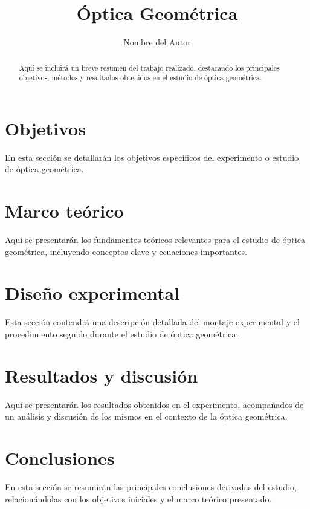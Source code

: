 \documentclass[twocolumn,a4paper,11pt]{scrartcl}
\title{Óptica Geométrica}
\author{Nombre del Autor}
\date{}
\begin{document}
\maketitle

\begin{abstract}
Aquí se incluirá un breve resumen del trabajo realizado, destacando los principales objetivos, métodos y resultados obtenidos en el estudio de óptica geométrica.
\end{abstract}

\section{Objetivos}
En esta sección se detallarán los objetivos específicos del experimento o estudio de óptica geométrica.

\section{Marco teórico}
Aquí se presentarán los fundamentos teóricos relevantes para el estudio de óptica geométrica, incluyendo conceptos clave y ecuaciones importantes.

\section{Diseño experimental}
Esta sección contendrá una descripción detallada del montaje experimental y el procedimiento seguido durante el estudio de óptica geométrica.

\section{Resultados y discusión}
Aquí se presentarán los resultados obtenidos en el experimento, acompañados de un análisis y discusión de los mismos en el contexto de la óptica geométrica.

\section{Conclusiones}
En esta sección se resumirán las principales conclusiones derivadas del estudio, relacionándolas con los objetivos iniciales y el marco teórico presentado.


\end{document}

